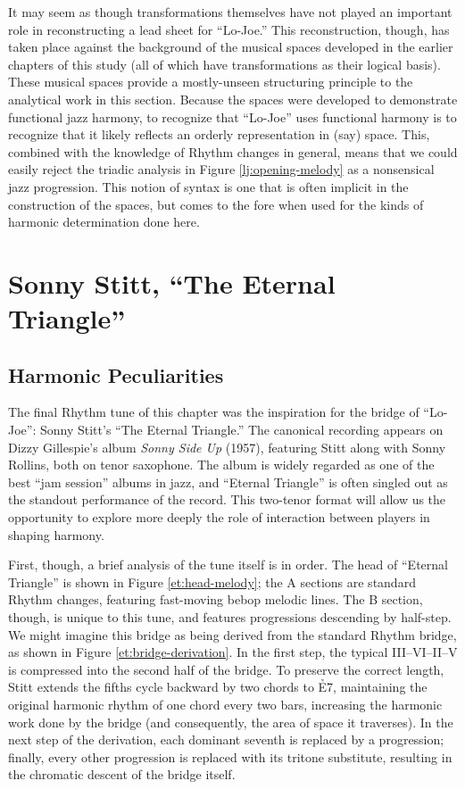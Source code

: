It may seem as though transformations themselves have not played an important
role in reconstructing a lead sheet for ``Lo-Joe.'' This reconstruction,
though, has taken place against the background of the musical spaces developed
in the earlier chapters of this study (all of which have transformations as
their logical basis). These musical spaces provide a mostly-unseen structuring
principle to the analytical work in this section. Because the spaces were
developed to demonstrate functional jazz harmony, to recognize that ``Lo-Joe''
uses functional harmony is to recognize that it likely reflects an orderly
representation in (say) \tf space. This, combined with the knowledge of Rhythm
changes in general, means that we could easily reject the triadic analysis in
Figure \ref{lj:opening-melody} as a nonsensical jazz progression. This notion
of syntax is one that is often implicit in the construction of the spaces, but
comes to the fore when used for the kinds of harmonic determination done
here.

\section{Sonny Stitt, “The Eternal Triangle”}
\label{sec:eternal-triangle}

\subsection{Harmonic Peculiarities}

The final Rhythm tune of this chapter was the inspiration for the bridge of
``Lo-Joe'': Sonny Stitt's ``The Eternal Triangle.'' The canonical recording
appears on Dizzy Gillespie's album \emph{Sonny Side Up} (1957), featuring
Stitt along with Sonny Rollins, both on tenor
saxophone.\nocite{gillespie:sonnyside} The album is widely regarded as one of
the best ``jam session'' albums in jazz, and ``Eternal Triangle'' is often
singled out as the standout performance of the record. This two-tenor
format will allow us the opportunity to explore more deeply the role of
interaction between players in shaping harmony.

First, though, a brief analysis of the tune itself is in order. The head of
``Eternal Triangle'' is shown in Figure \ref{et:head-melody}; the A sections
are standard Rhythm changes, featuring fast-moving bebop melodic lines. The B section,
though, is unique to this tune, and features \tf progressions descending
by half-step. We might imagine this bridge as being derived from the standard
Rhythm bridge, as shown in Figure \ref{et:bridge-derivation}. In the first
step, the typical III--VI--II--V is compressed into the second half of the
bridge. To preserve the correct length, Stitt extends the fifths cycle
backward by two chords to \h{E7}, maintaining the original harmonic rhythm of
one chord every two bars, increasing the harmonic work done by the bridge (and
consequently, the area of \tf space it traverses). In the next step of the
derivation, each dominant seventh is replaced by a \tf progression;
finally, every other \tf progression is replaced with its tritone
substitute, resulting in the chromatic descent of the bridge itself.

